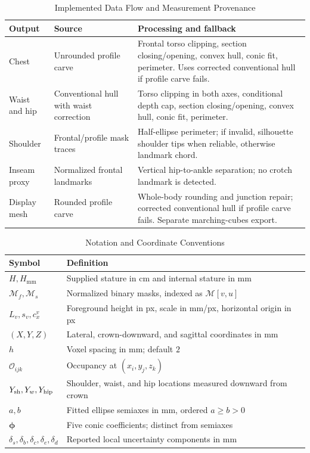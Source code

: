 \documentclass[11pt,a4paper]{article}
\numberwithin{equation}{section}
\begin{document}
\begin{table}[!t]
\caption{Implemented Data Flow and Measurement Provenance}
\label{tab:branch_provenance}
\centering\small
\begin{tabular}{L{2.0cm}L{4.6cm}L{8.1cm}}
\toprule
Output & Source & Processing and fallback \\
\midrule
Chest & Unrounded profile carve & Frontal torso clipping, section closing/opening, convex hull, conic fit, perimeter. Uses corrected conventional hull if profile carve fails. \\
Waist and hip & Conventional hull with waist correction & Torso clipping in both axes, conditional depth cap, section closing/opening, convex hull, conic fit, perimeter. \\
Shoulder & Frontal/profile mask traces & Half-ellipse perimeter; if invalid, silhouette shoulder tips when reliable, otherwise landmark chord. \\
Inseam proxy & Normalized frontal landmarks & Vertical hip-to-ankle separation; no crotch landmark is detected. \\
Display mesh & Rounded profile carve & Whole-body rounding and junction repair; corrected conventional hull if profile carve fails. Separate marching-cubes export. \\
\bottomrule
\end{tabular}
\end{table}

\begin{table}[!t]
\caption{Notation and Coordinate Conventions}
\label{tab:notation}
\centering\small
\begin{tabular}{lL{5.7cm}}
\toprule
Symbol & Definition \\
\midrule
$H,H_{\mathrm{mm}}$ & Supplied stature in cm and internal stature in mm \\
$\mathcal M_f,\mathcal M_s$ & Normalized binary masks, indexed as $\mathcal M[v,u]$ \\
$L_v,s_v,c_x^v$ & Foreground height in px, scale in mm/px, horizontal origin in px \\
$(X,Y,Z)$ & Lateral, crown-downward, and sagittal coordinates in mm \\
$h$ & Voxel spacing in mm; default $2$ \\
$\mathcal O_{ijk}$ & Occupancy at $(x_i,y_j,z_k)$ \\
$Y_{\rm sh},Y_w,Y_{\rm hip}$ & Shoulder, waist, and hip locations measured downward from crown \\
$a,b$ & Fitted ellipse semiaxes in mm, ordered $a\ge b>0$ \\
$\boldsymbol\phi$ & Five conic coefficients; distinct from semiaxes \\
$\delta_s,\delta_b,\delta_c,\delta_e,\delta_d$ & Reported local uncertainty components in mm \\
\bottomrule
\end{tabular}
\end{table}
\end{document}
